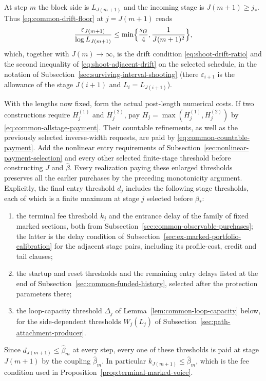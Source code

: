 At step $m$ the block side is $L_{J(m+1)}$ and the incoming stage is
$J(m+1)\ge j_*$. Thus \eqref{eq:common-drift-floor} at $j=J(m+1)$
reads
\[
 \frac{\varepsilon_{J(m+1)}}{\log L_{J(m+1)}}\le
   \min\Bigl\{\frac{s_G}4,\frac1{J(m+1)^2}\Bigr\},
\]
which, together with $J(m)\to\infty$, is the drift condition
\eqref{eq:shoot-drift-ratio} and the second inequality of
\eqref{eq:shoot-adjacent-drift} on the selected schedule, in the
notation of Subsection~\ref{sec:surviving-interval-shooting} (there
$\varepsilon_{i+1}$ is the allowance of the stage $J(i+1)$ and
$L_i=L_{J(i+1)}$).

With the lengths now fixed, form the actual post-length numerical
costs. If two constructions require $H_j^{(1)}$ and $H_j^{(2)}$,
pay $H_j=\max(H_j^{(1)},H_j^{(2)})$ by
\eqref{eq:common-allstage-payment}. Their countable refinements,
as well as the previously selected inverse-width requests, are
paid by \eqref{eq:common-countable-payment}. Add the nonlinear
entry requirements of Subsection~\ref{sec:nonlinear-payment-selection}
and every other selected finite-stage threshold before constructing
$J$ and $\widehat\beta$. Every realization paying these enlarged
thresholds preserves all the earlier purchases by the preceding
monotonicity argument. Explicitly, the final entry threshold $d_j$
includes the following stage thresholds, each of which is a finite
maximum at stage $j$ selected before $\beta_*$:
\begin{enumerate}
\item the terminal fee threshold $k_j$ and the entrance delay of the
 family of fixed marked sections, both from
 Subsection~\ref{sec:common-observable-purchases}; the latter is the delay
 condition of Subsection~\ref{sec:ex-marked-portfolio-calibration} for the
 adjacent stage pairs, including its profile-cost, credit and tail
 clauses;
\item the startup and reset thresholds and the remaining entry delays
 listed at the end of Subsection~\ref{sec:common-funded-history},
 selected after the protection parameters there;
\item the loop-capacity threshold $\Delta_j$ of
 Lemma~\ref{lem:common-loop-capacity} below, for the side-dependent
 thresholds $W_j(L_j)$ of Subsection~\ref{sec:path-attachment-producer}.
\end{enumerate}
Since $d_{J(m+1)}\le\widehat\beta_m$ at every step, every one of these
thresholds is paid at stage $J(m+1)$ by the coupling $\widehat\beta_m$.
In particular $k_{J(m+1)}\le\widehat\beta_m$, which is the fee condition
used in Proposition~\ref{prop:terminal-marked-voice}.

